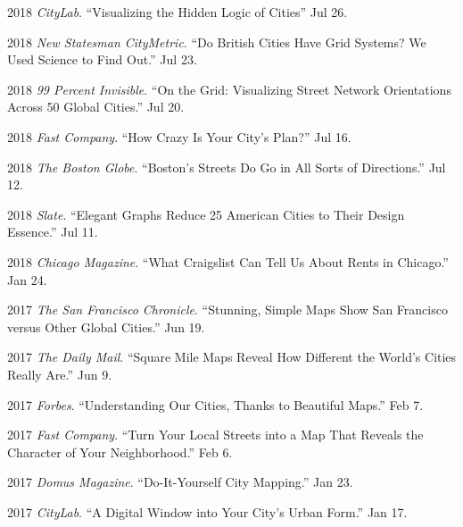 \documentclass[12pt,letterpaper]{report}
\begin{document}
\begin{tablist}

\item 2018 \tab \textit{CityLab}. \enquote{Visualizing the Hidden Logic of Cities} Jul 26.

\item 2018 \tab \textit{New Statesman CityMetric}. \enquote{Do British Cities Have Grid Systems? We Used Science to Find Out.} Jul 23.

\item 2018 \tab \textit{99 Percent Invisible}. \enquote{On the Grid: Visualizing Street Network Orientations Across 50 Global Cities.} Jul 20.

\item 2018 \tab \textit{Fast Company}. \enquote{How Crazy Is Your City's Plan?} Jul 16.

\item 2018 \tab \textit{The Boston Globe}. \enquote{Boston's Streets Do Go in All Sorts of Directions.} Jul 12.

\item 2018 \tab \textit{Slate}. \enquote{Elegant Graphs Reduce 25 American Cities to Their Design Essence.} Jul 11.	

\item 2018 \tab \textit{Chicago Magazine}. \enquote{What Craigslist Can Tell Us About Rents in Chicago.} Jan 24.
	
\item 2017 \tab \textit{The San Francisco Chronicle}. \enquote{Stunning, Simple Maps Show San Francisco versus Other Global Cities.} Jun 19.

\item 2017 \tab \textit{The Daily Mail}. \enquote{Square Mile Maps Reveal How Different the World's Cities Really Are.} Jun 9.

\item 2017 \tab \textit{Forbes}. \enquote{Understanding Our Cities, Thanks to Beautiful Maps.} Feb 7.

\item 2017 \tab \textit{Fast Company}. \enquote{Turn Your Local Streets into a Map That Reveals the Character of Your Neighborhood.} Feb 6.

\item 2017 \tab \textit{Domus Magazine}. \enquote{Do-It-Yourself City Mapping.} Jan 23.

\item 2017 \tab \textit{CityLab}. \enquote{A Digital Window into Your City's Urban Form.} Jan 17.


\end{tablist}
\end{document}
